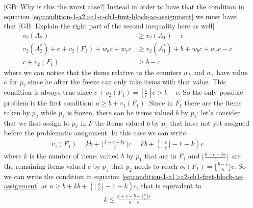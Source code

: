 \documentclass{article}
\newcommand{\gb}[1]{{\color{red}[GB: #1]}}
\begin{document}
\gb{Why is this the worst case?}
Instead in order to have that the condition in equation \ref{eq:condition-1-a2>a1-c-ch1-first-block-ac-assignment} we must have that
\gb{Explain the right part of the second inequality here as well}
\begin{align*}
    v_2(A_2) &\ge v_2(A_1) -c\\
    v_2(A_2^*) + c + v_2(F_1)+ w_b c + w_c c &\ge v_2(A_1^*) + b + w_b c + w_c c - c\\
    c  + v_2(F_1)&\ge  b - c 
\end{align*}
where we can notice that the items relative to the counters $w_b$ and $w_c$ have value $c$ for $p_2$ since he after the freeze can only take items with that value.
This condition is always true since $ c  + v_2(F_1) =\left \lfloor \frac{b}{c}\right\rfloor c > b-c$. So the only possible problem is the first condition: $a \ge  b + v_1(F_1)$. Since in $F_1$ there are the items taken by $p_2$ while $p_1$ is frozen, there can be items valued $b$ by $p_1$; let's consider that we first assign to $p_2$ in $F$ the items valued $b$ by $p_1$ that have not yet assigned before the problematic assignment. In this case we can write
\begin{align*}
    v_1(F_1) = kb + \lfloor \frac{b-c-kc}{c}\rfloor c = kb + (\lfloor \frac{b}{c}\rfloor -1-k)c
\end{align*}
where $k$ is the number of items valued $b$ by $p_1$ that are in $F_1$ and $\lfloor \frac{b-c-kc}{c}\rfloor$ are the remaining items valued $c$ by $p_1$ that $p_2$ needs to reach $v_2(F_1)  = \lfloor \frac{b-c}{b}\rfloor c$. So we can write the condition in equation \ref{eq:condition-1-a1>a2-ch1-first-block-ac-assignment} as $a \ge b +kb + (\lfloor \frac{b}{c}\rfloor -1-k)c $, that is equivalent to 
\begin{align}
    k \le \frac{a + c - b - \lfloor \frac{b}{c}\rfloor c }{b-c}
    \label{eq:condition-1-a1>a2-ch1-first-block-ac-assignment-on-k}
\end{align}
\end{document}
